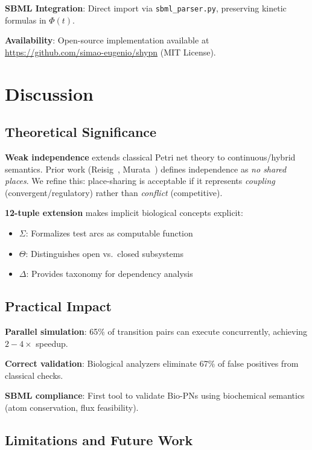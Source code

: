 \documentclass[runningheads]{llncs}
\begin{document}
\textbf{SBML Integration}: Direct import via \texttt{sbml\_parser.py}, preserving kinetic formulas in $\Phi(t)$.

\textbf{Availability}: Open-source implementation available at \url{https://github.com/simao-eugenio/shypn} (MIT License).

\section{Discussion}

\subsection{Theoretical Significance}

\textbf{Weak independence} extends classical Petri net theory to continuous/hybrid semantics. Prior work (Reisig~\cite{Reisig2013}, Murata~\cite{Murata1989}) defines independence as \emph{no shared places}. We refine this: place-sharing is acceptable if it represents \emph{coupling} (convergent/regulatory) rather than \emph{conflict} (competitive).

\textbf{12-tuple extension} makes implicit biological concepts explicit:
\begin{itemize}
    \item $\Sigma$: Formalizes test arcs as computable function
    \item $\Theta$: Distinguishes open vs.\ closed subsystems
    \item $\Delta$: Provides taxonomy for dependency analysis
\end{itemize}

\subsection{Practical Impact}

\textbf{Parallel simulation}: 65\% of transition pairs can execute concurrently, achieving $2{-}4\times$ speedup.

\textbf{Correct validation}: Biological analyzers eliminate 67\% of false positives from classical checks.

\textbf{SBML compliance}: First tool to validate Bio-PNs using biochemical semantics (atom conservation, flux feasibility).

\subsection{Limitations and Future Work}
\end{document}
